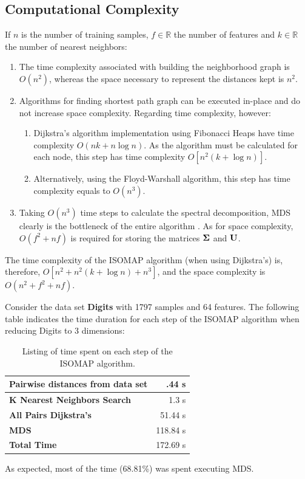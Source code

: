 \subsection{Computational Complexity}
\label{sec:isocomplexity}

If $n$ is the number of training samples, $f \in \mathbb{R}$ the number of features and $k \in \mathbb{R}$ the number of nearest neighbors:

\begin{enumerate}
	\item The time complexity associated with building the neighborhood graph is $O(n^2)$, whereas the space necessary to represent the distances kept is $n^2$.
	\item Algorithms for finding shortest path graph can be executed in-place and do not increase space complexity. Regarding time complexity, however:
	\begin{enumerate}
		\item Dijkstra's algorithm implementation using Fibonacci Heaps have time complexity $O(nk + n \log n)$. As the algorithm must be calculated for each node, this step has time complexity $O[n^2(k + \log n)]$.
		\item Alternatively, using the Floyd-Warshall algorithm, this step has time complexity equals to $O(n^3)$.
	\end{enumerate}
	\item Taking $O(n^3)$ time steps to calculate the spectral decomposition, MDS clearly is the bottleneck of the entire algorithm \cite{cay2005, silva2002global}. As for space complexity, $O(f^2 + nf)$ is required for storing the matrices $\mathbf{\Sigma}$ and $\mathbf{U}$.
\end{enumerate}

The time complexity of the ISOMAP algorithm (when using Dijkstra's) is, therefore, $O[n^2 + n^2(k + \log n) + n^3]$, and the space complexity is $O(n^2 + f^2 + nf)$.

\begin{experiment}
	Consider the data set \textbf{Digits} with 1797 samples and 64 features. The following table indicates the time duration for each step of the ISOMAP algorithm when reducing Digits to 3 dimensions:

	\begin{table}[H]
		\centering
		\begin{tabular}{|l|r|}
			\hline
			\textbf{Pairwise distances from data set} & .44 s \\\hline
			\textbf{K Nearest Neighbors Search} & 1.3 s \\\hline
			\textbf{All Pairs Dijkstra's} & 51.44 s\\\hline
			\textbf{MDS} & 118.84 s \\\hline
			\textbf{Total Time} & 172.69 s \\\hline
		\end{tabular}

		\caption{Listing of time spent on each step of the ISOMAP algorithm.}
	\end{table}

	As expected, most of the time (68.81\%) was spent executing MDS.
\end{experiment}

